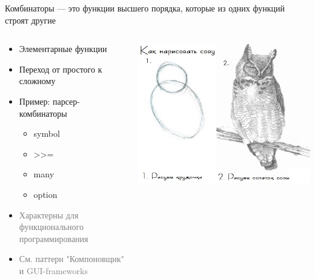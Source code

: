 \documentclass[sans]{beamer}
\begin{document}
\begin{frame}{Комбинаторы}
  — это функции высшего порядка, которые из одних функций строят другие
 

  \begin{center}
  \begin{columns}
		\begin{column}{0.5\linewidth}
      \textcolor{myGray}{
        \scriptsize
        \begin{itemize}
          \item Элементарные функции
          \item Переход от простого к сложному
          \item Пример: парсер-комбинаторы
          \begin{itemize}
            \scriptsize
            \item symbol
            \item >>=
            \item many
            \item option
          \end{itemize}
          \item \textcolor{gray}{Характерны для функционального программирования}
          \item \textcolor{gray}{См. паттерн "Компоновщик" и GUI-frameworks}
        \end{itemize}
      }
		\end{column}
		\begin{column}{0.5\linewidth}
	    \includegraphics[width = \linewidth]{images/owl.jpg}
		\end{column}
	\end{columns}
  \end{center}
\end{frame}
\end{document}
